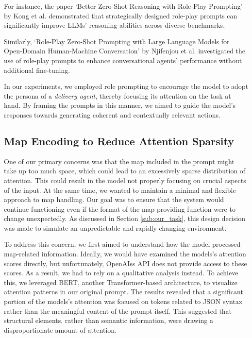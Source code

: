For instance, the paper `Better Zero-Shot Reasoning with Role-Play Prompting' by
Kong et al. \cite{kong2024betterzeroshotreasoningroleplay} demonstrated that strategically
designed role-play prompts can significantly improve LLMs' reasoning abilities
across diverse benchmarks.

Similarly, `Role-Play Zero-Shot Prompting with Large Language Models for Open-Domain
Human-Machine Conversation' by Njifenjou et al.
\cite{njifenjou2024roleplayzeroshotpromptinglarge} investigated the use of role-play
prompts to enhance conversational agents' performance without additional fine-tuning.

In our experiments, we employed role prompting to encourage the model to adopt
the persona of a \emph{delivery agent}, thereby focusing its attention on the
task at hand. By framing the prompts in this manner, we aimed to guide the model's
responses towards generating coherent and contextually relevant actions.

\subsection{Map Encoding to Reduce Attention Sparsity}

One of our primary concerns was that the map included in the prompt might take up
too much space, which could lead to an excessively sparse distribution of
attention. This could result in the model not properly focusing on crucial aspects
of the input. At the same time, we wanted to maintain a minimal and flexible approach
to map handling. Our goal was to ensure that the system would continue
functioning even if the format of the map-providing function were to change
unexpectedly. As discussed in Section \ref{sub:our_task}, this design decision
was made to simulate an unpredictable and rapidly changing environment.

To address this concern, we first aimed to understand how the model processed map-related
information. Ideally, we would have examined the models's attention scores directly,
but unfortunately, OpenAIss API does not provide access to these scores. As a
result, we had to rely on a qualitative analysis instead. To achieve this, we leveraged
BERT, another Transformer-based architecture, to visualize attention patterns in
our original prompt. The results revealed that a significant portion of the
models's attention was focused on tokens related to JSON syntax rather than the
meaningful content of the prompt itself. This suggested that structural elements,
rather than semantic information, were drawing a disproportionate amount of attention.

